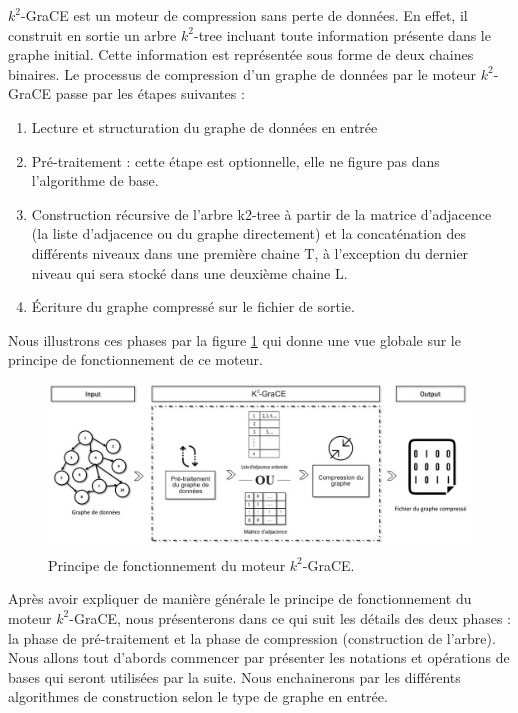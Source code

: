 \documentclass[a4paper,oneside,12pt]{report}
\theoremstyle{definition}
\begin{document}
	
$k^2$-GraCE est un moteur de compression sans perte de données. En effet, il construit en sortie un arbre $k^2$-tree incluant toute information présente dans le graphe initial. Cette information est représentée sous forme de deux chaines binaires. Le processus de compression d'un graphe de données par le moteur $k^2$-GraCE passe par les étapes suivantes :
\begin{enumerate}
\item Lecture et structuration du graphe de données en entrée 
\item Pré-traitement : cette étape est optionnelle, elle ne figure pas dans l'algorithme de base. 
\item Construction récursive de l'arbre k2-tree à partir de la matrice d'adjacence (la liste d'adjacence ou du graphe directement) et la concaténation des différents niveaux dans une première chaine T, à l'exception du dernier niveau qui sera stocké dans une deuxième chaine L.

\item Écriture du graphe compressé sur le fichier de sortie.
\end{enumerate}

Nous illustrons ces phases par la figure \ref{k2grace} qui donne une vue globale sur le principe de fonctionnement de ce moteur.


\begin{figure}[H]
\includegraphics[scale=0.48]{./ressources/image/ograce.jpg}
\caption[Principe de fonctionnement du moteur $k^2$-GraCE]{Principe de fonctionnement du moteur $k^2$-GraCE.}
			\label{k2grace}
\end{figure}
Après avoir expliquer de manière générale le principe de fonctionnement du moteur $k^2$-GraCE, nous présenterons dans ce qui suit les détails des deux phases : la phase de pré-traitement et la phase de compression (construction de l'arbre). Nous allons tout d'abords commencer par présenter les notations et opérations de bases qui seront utilisées par la suite. Nous enchainerons par les différents algorithmes de construction selon le type de graphe en entrée.
		
\end{document}

